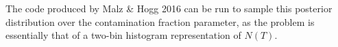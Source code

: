 \documentclass[12pt, onecolumn]{emulateapj}
\begin{document}
The code produced by Malz \& Hogg 2016 can be run to sample this posterior distribution over the contamination fraction parameter, as the problem is essentially that of a two-bin histogram representation of $N(T)$.   





\end{document}
